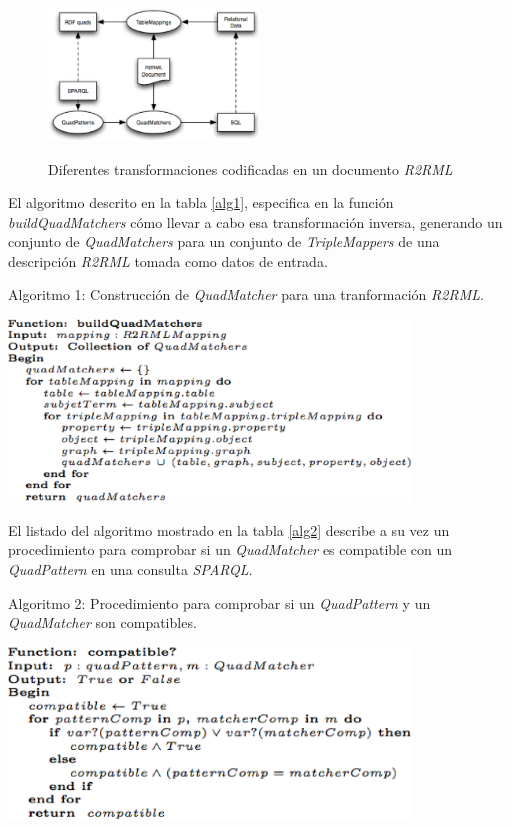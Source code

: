 \begin{figure}
\vspace{2.4in}
\caption{Diferentes transformaciones codificadas en un documento \textit{R2RML}}
\includegraphics[width=0.5\textwidth]{figura2}
\label{figura2}
\end{figure}


El algoritmo descrito en la tabla \ref{alg1}, especifica en la funci\'on \textit{buildQuadMatchers} c\'omo llevar a cabo esa transformaci\'on inversa, generando un conjunto de \textit{QuadMatchers} para un conjunto de \textit{TripleMappers} de una descripci\'on \textit{R2RML} tomada como datos de entrada.\\

\begin{table}
\vspace{2.4in}
\caption{Algoritmo 1: Construcci\'on de \textit{QuadMatcher} para una tranformaci\'on \textit{R2RML}.}
\includegraphics[width=0.8\textwidth]{algoritmo1}
\label{alg1}
\end{table}

El listado del algoritmo mostrado en la tabla \ref{alg2} describe a su vez un procedimiento para comprobar si un \textit{QuadMatcher} es compatible con un \textit{QuadPattern} en una consulta \textit{SPARQL}.\\

\begin{table}
\vspace{2.4in}
\caption{Algoritmo 2: Procedimiento para comprobar si un \textit{QuadPattern} y un \textit{QuadMatcher} son compatibles.}
\includegraphics[width=0.8\textwidth]{algoritmo2}
\label{alg2}
\end{table}

